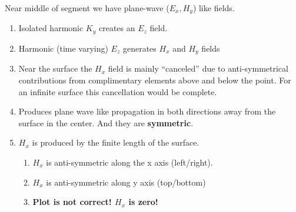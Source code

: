 \documentclass{article}
\newcommand{\0}{\varnothing}
\begin{document}
\begin{minipage}{0.45\textwidth}
Near middle of segment we have plane-wave ($E_x, H_y$) like fields. 
\begin{enumerate}
    \item Isolated harmonic $K_y$ creates an $E_z$ field.
    \item Harmonic (time varying) $E_z$ generates $H_x$ and $H_y$ fields
    \item Near the surface the $H_x$ field is mainly ``canceled'' due to anti-symmetrical contributions from complimentary elements above and below the point. For an infinite surface this cancellation would be complete.
    \item Produces plane wave like propagation in both directions away from the surface in the center. And they are {\bf symmetric}.
    \item $H_x$ is produced by the finite length of the surface.
    \begin{enumerate}
        \item $H_x$ is anti-symmetric along the x axis (left/right).
        \item $H_x$ is anti-symmetric along y axis (top/bottom)
        \item {\bf Plot is not correct! $H_x$ is zero!}
    \end{enumerate}
\end{enumerate}
\end{minipage}
\end{document}

